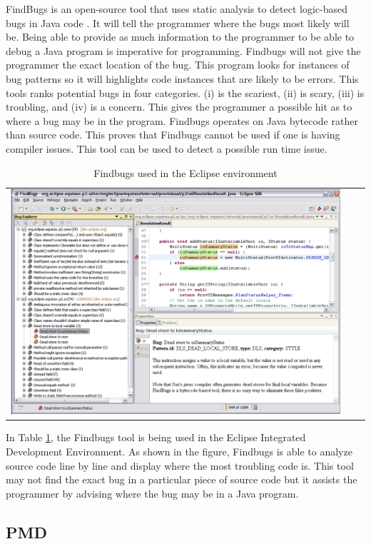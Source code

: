 FindBugs is an open-source tool that uses static analysis to detect logic-based bugs in Java code \cite{BugFindingTools}. It will tell the programmer where the bugs most likely will be. Being able to provide as much information to the programmer to be able to debug a Java program is imperative for programming. Findbugs will not give the programmer the exact location of the bug. This program looks for instances of bug patterns so it will highlights code instances that are likely to be errors. This tools ranks potential bugs in four categories. (i) is the scariest, (ii) is scary, (iii) is troubling, and (iv) is a concern. This gives the programmer a possible hit as to where a bug may be in the program. Findbugs operates on Java bytecode rather than source code. This proves that Findbugs cannot be used if one is having compiler issues. This tool can be used to detect a possible run time issue.  
\newpage
\begin{table}[htbp]
\begin{tabular}{|c||c|c|}
\hline
\includegraphics[scale=0.45]{findbugs1}
\end{tabular}
\caption{Findbugs used in the Eclipse environment}
\label{tab:fb}
\end{table}

In Table \ref{tab:fb}, the Findbugs tool is being used in the Eclipse Integrated Development Environment. As shown in  the figure, Findbugs is able to analyze source code line by line and display where the most troubling code is. This tool may not find the exact bug in a particular piece of source code but it assists the programmer by advising where the bug may be in a Java program.


\subsection{PMD}

